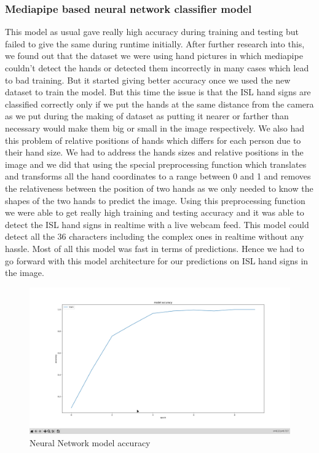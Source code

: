 \documentclass[12pt,a4paper]{report}
\begin{document}
\subsubsection{Mediapipe based neural network classifier model}
This model as usual gave really high accuracy during training and testing but failed to give the same during runtime initially. After further research into this, we found out that the dataset we were using hand pictures in which mediapipe couldn't detect the hands or detected them incorrectly in many cases which lead to bad training. But it started giving better accuracy once we used the new dataset to train the model. But this time the issue is that the ISL hand signs are classified correctly only if we put the hands at the same distance from the camera as we put during the making of dataset as putting it nearer or farther than necessary would make them big or small in the image respectively. We also had this problem of relative positions of hands which differs for each person due to their hand size. We had to address the hands sizes and relative positions in the image and we did that using the special preprocessing function which translates and transforms all the hand coordinates to a range between 0 and 1 and removes the relativeness between the position of two hands as we only needed to know the shapes of the two hands to predict the image. Using this preprocessing function we were able to get really high training and testing accuracy and it was able to detect the ISL hand signs in realtime with a live webcam feed. This model could detect all the 36 characters including the complex ones in realtime without any hassle. Most of all this model was fast in terms of predictions. Hence we had to go forward with this model architecture for our predictions on ISL hand signs in the image.
\begin{figure}[htbp]
	\centerline{\includegraphics[scale=0.15]{neural_network_accuracy.png}}
	\caption{Neural Network model accuracy}
	\label{Neural_net_accuracy}
\end{figure}
\end{document}
